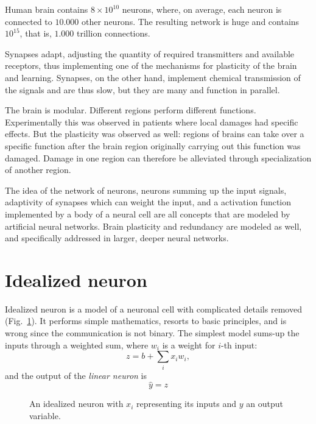 \begin{refsection}
Human brain contains $8\times 10^{10}$ neurons, where, on average, each neuron is connected to $10.000$ other neurons. The resulting network is huge and contains $10^{15}$, that is, $1.000$ trillion connections. 

Synapses adapt, adjusting the quantity of required transmitters and available receptors, thus implementing one of the mechanisms for plasticity of the brain and learning. Synapses, on the other hand, implement chemical transmission of the signals and are thus slow, but they are many and function in parallel.

The brain is modular. Different regions perform different functions. Experimentally this was observed in patients where local damages had specific effects. But the plasticity was observed as well: regions of brains can take over a specific function after the brain region originally carrying out this function was damaged. Damage in one region can therefore be alleviated through specialization of another region.

The idea of the network of neurons, neurons summing up the input signals, adaptivity of synapses which can weight the input, and a activation function implemented by a body of a neural cell are all concepts that are modeled by artificial neural networks. Brain plasticity and redundancy are modeled as well, and specifically addressed in larger, deeper neural networks.

\section{Idealized neuron}

Idealized neuron is a model of a neuronal cell with complicated details removed (Fig.~\ref{fig:idealized-neuron}). It performs simple mathematics, resorts to basic principles, and is wrong since the communication is not binary. The simplest model sums-up the inputs through a weighted sum, where $w_i$ is a weight for $i$-th input:
\begin{equation}
z = b + \sum_i x_i w_i,
\end{equation}
and the output of the {\em linear neuron} is
\begin{equation}
\hat{y} = z
\end{equation}

\begin{figure}
\caption{An idealized neuron with $x_i$ representing its inputs and $y$ an output variable.}
\label{fig:idealized-neuron}
\end{figure}


\end{refsection}
